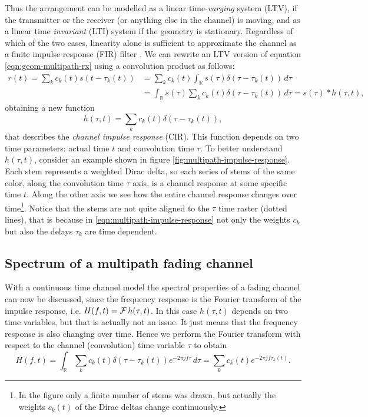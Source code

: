 Thus the arrangement can be modelled as a linear time-\emph{varying} system (LTV), if the transmitter or the receiver (or anything else in the channel) is moving, and as a linear time \emph{invariant} (LTI) system if the geometry is stationary. Regardless of which of the two cases, linearity alone is sufficient to approximate the channel as a finite impulse response (FIR) filter \cite{Messier}. We can rewrite an LTV version of equation \eqref{eqn:geom-multipath-rx} using a convolution product as follows:
\begin{align*}
	r(t) = \sum_k c_k(t) s(t - \tau_k(t)) &= \sum_k c_k(t) \int_\mathbb{R} s(\tau) \delta(\tau - \tau_k(t)) \,d\tau \\
		&= \int_\mathbb{R} s(\tau) \sum_k c_k(t) \delta(\tau - \tau_k(t)) \,d\tau = s(\tau) * h(\tau, t),
\end{align*}
obtaining a new function
\begin{equation} \label{eqn:multipath-impulse-response}
	h(\tau, t) = \sum_k c_k(t) \delta(\tau - \tau_k(t)),
\end{equation}
that describes the \emph{channel impulse response} (CIR). This function depends on two time parameters: actual time \(t\) and convolution time \(\tau\). To better understand \(h(\tau, t)\), consider an example shown in figure \ref{fig:multipath-impulse-response}. Each stem represents a weighted Dirac delta, so each series of stems of the same color, along the convolution time \(\tau\) axis, is a channel response at some specific time \(t\). Along the other axis we see how the entire channel response changes over time\footnote{In the figure only a finite number of stems was drawn, but actually the weights \(c_k(t)\) of the Dirac deltas change continuously.}. Notice that the stems are not quite aligned to the \(\tau\) time raster (dotted lines), that is because in \eqref{eqn:multipath-impulse-response} not only the weights \(c_k\) but also the delays \(\tau_k\) are time dependent.

\subsection{Spectrum of a multipath fading channel}

With a continuous time channel model the spectral properties of a fading channel can now be discussed, since the frequency response is the Fourier transform of the impulse response, i.e. \(H(f, t) = \operatorname{\mathcal{F}} h(\tau, t)\). In this case \(h(\tau, t)\) depends on two time variables, but that is actually not an issue. It just means that the frequency response is also changing over time. Hence we perform the Fourier transform with respect to the channel (convolution) time variable \(\tau\) to obtain
\begin{equation} \label{eqn:multipath-frequency-response}
	H(f, t) = \int_\mathbb{R} \sum_k c_k(t) \delta(\tau - \tau_k(t)) e^{-2\pi jf\tau} \, d\tau
	= \sum_k c_k(t) e^{-2\pi jf \tau_k(t)}.
\end{equation}

